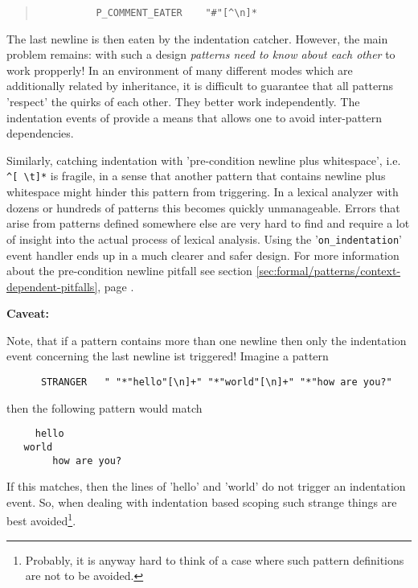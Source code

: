 \begin{quote}
  \begin{verbatim}
          P_COMMENT_EATER    "#"[^\n]*
  \end{verbatim}
\end{quote}

The last newline is then eaten by the indentation catcher. However, the main
problem remains: with such a design {\it patterns need to know about each
  other} to work propperly! In an environment of many different modes which
are additionally related by inheritance, it is difficult to guarantee that all
patterns 'respect' the quirks of each other. They better work independently.
The indentation events of {\quex} provide a means that allows one to avoid
inter-pattern dependencies.

Similarly, catching indentation with 'pre-condition newline plus whitespace',
i.e.  {\tt \verb|^[ \t]*|} is fragile, in a sense that another pattern that
contains newline plus whitespace might hinder this pattern from triggering.
In a lexical analyzer with dozens or hundreds of patterns this becomes
quickly unmanageable. Errors that arise from patterns defined somewhere
else are very hard to find and require a lot of insight into the actual
process of lexical analysis. Using the '{\tt on\_indentation}' event
handler ends up in a much clearer and safer design. For more information
about the pre-condition newline pitfall see section
\ref{sec:formal/patterns/context-dependent-pitfalls}, page
\pageref{formal/patterns/context-dependent-pitfalls}.

{\bf Caveat:} 

Note, that if a pattern contains more than one newline then
only the indentation event concerning the last newline ist triggered! Imagine
a pattern

\begin{lstlisting}
      STRANGER   " "*"hello"[\n]+" "*"world"[\n]+" "*"how are you?"
\end{lstlisting}

then the following pattern would match 

\begin{lstlisting}
     hello
   world
        how are you?
\end{lstlisting}

If this matches, then the lines of 'hello' and 'world' do not trigger an
indentation event. So, when dealing with indentation based scoping such strange
things are best avoided\footnote{Probably, it is anyway hard to think of a case
    where such pattern definitions are not to be avoided.}.
